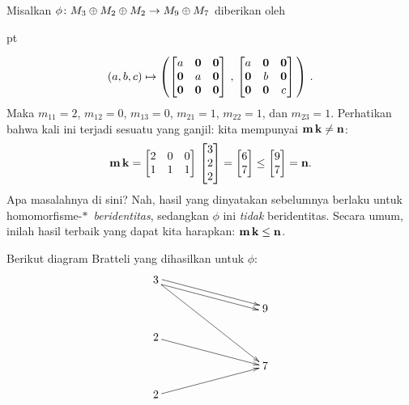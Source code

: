 \begin{exam} Misalkan $\phi\colon M_3 \oplus M_2 \oplus M_2 \rightarrow M_9 \oplus M_7$
diberikan oleh

 pt

 \[ (a,b,c) \mapsto \left(
    \begin{bmatrix}
            a & \mathbf{0} & \mathbf{0} \\
        \mathbf{0} &     a & \mathbf{0} \\
        \mathbf{0} & \mathbf{0} & \mathbf{0}
      \end{bmatrix}\, , \,
      \begin{bmatrix}
            a & \mathbf{0} & \mathbf{0}  \\
        \mathbf{0} &     b & \mathbf{0}  \\
        \mathbf{0} & \mathbf{0} &     c
      \end{bmatrix}\, \right)\, .\]
Maka $m_{11} = 2$, $m_{12} = 0$, $m_{13} = 0$, $m_{21} = 1$, $m_{22} = 1$, dan $m_{23} = 1$.
Perhatikan bahwa kali ini terjadi sesuatu yang ganjil: kita mempunyai $\mathbf{m}\,\mathbf{k} \ne \mathbf{n}$:
 \[\mathbf{m} \,\mathbf{k} = \begin{bmatrix} 2 & 0 & 0 \\ 1 & 1 & 1 \end{bmatrix}\,
             \begin{bmatrix} 3 \\ 2 \\ 2 \end{bmatrix} =
             \begin{bmatrix} 6 \\ 7 \end{bmatrix} \le
             \begin{bmatrix} 9 \\ 7 \end{bmatrix} = \mathbf{n}.\]
Apa masalahnya di sini? Nah, hasil yang dinyatakan sebelumnya berlaku untuk homomorfisme-$*\,$
\emph{beridentitas}, sedangkan $\phi$ ini \emph{tidak} beridentitas. Secara umum, inilah hasil terbaik
yang dapat kita harapkan: $\mathbf{m}\,\mathbf{k} \le \mathbf{n}$.

\noindent Berikut diagram Bratteli yang dihasilkan untuk $\phi$:
   \[\xymatrix@=+20pt@C+20pt@R-7pt{
        3\ar@<+.5ex>[drr]\ar@<-.5ex>[drr]\ar[dddrr] && \\
                            && 9                   \\
                           2\ar[drr] &&            \\
                            && 7                   \\
                           2\ar[urr] &&
   }\]
\end{exam}


